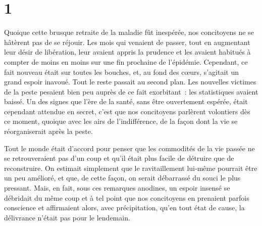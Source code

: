 \documentclass[french,twoside]{book} %
\begin{document}
\section[{1}]{1}
\noindent Quoique cette brusque retraite de la maladie fût inespérée, nos concitoyens ne se hâtèrent pas de se réjouir. Les mois qui venaient de passer, tout en augmentant leur désir de libération, leur avaient appris la prudence et les avaient habitués à compter de moins en moins sur une fin prochaine de l’épidémie. Cependant, ce fait nouveau était sur toutes les bouches, et, au fond des cœurs, s’agitait un grand espoir inavoué. Tout le reste passait au second plan. Les nouvelles victimes de la peste pesaient bien peu auprès de ce fait exorbitant : les statistiques avaient baissé. Un des signes que l’ère de la santé, sans être ouvertement espérée, était cependant attendue en secret, c’est que nos concitoyens parlèrent volontiers dès ce moment, quoique avec les airs de l’indifférence, de la façon dont la vie se réorganiserait après la peste.\par
Tout le monde était d’accord pour penser que les commodités de la vie passée ne se retrouveraient pas d’un coup et qu’il était plus facile de détruire que de reconstruire. On estimait simplement que le ravitaillement lui-même pourrait être un peu amélioré, et que, de cette façon, on serait débarrassé du souci le plus pressant. Mais, en fait, sous ces remarques anodines, un espoir insensé se débridait du même coup et à tel point que nos concitoyens en prenaient parfois conscience et affirmaient alors, avec précipitation, qu’en tout état de cause, la délivrance n’était pas pour le lendemain.\par
\end{document}
